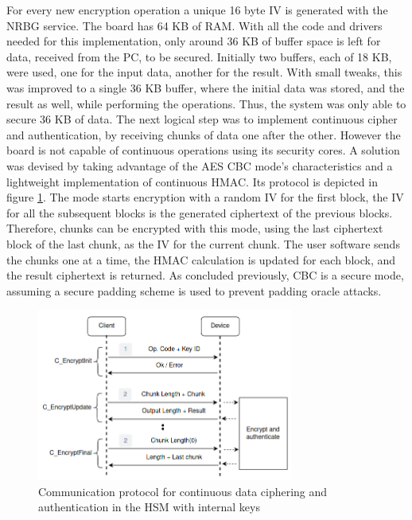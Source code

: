 For every new encryption operation a unique 16 byte \ac{IV} is generated with the \ac{NRBG} service.
The board has 64 KB of RAM. With all the code and drivers needed for this implementation, only around 36 KB of buffer space is left for data, received from the PC, to be secured. Initially two buffers, each of 18 KB, were used, one for the input data, another for the result. With small tweaks, this was improved to a single 36 KB buffer, where the initial data was stored, and the result as well, while performing the operations. Thus, the system was only able to secure 36 KB of data. The next logical step was to implement continuous cipher and authentication, by receiving chunks of data one after the other. However the board is not capable of continuous operations using its security cores.
A solution was devised by taking advantage of the AES \ac{CBC} mode's characteristics and a lightweight implementation of continuous HMAC. Its protocol is depicted in figure \ref{fig:protocol:data-exchange-chunks}. The mode starts encryption with a random IV for the first block, the IV for all the subsequent blocks is the generated ciphertext of the previous blocks. Therefore, chunks can be encrypted with this mode, using the last ciphertext block of the last chunk, as the IV for the current chunk. The user software sends the chunks one at a time, the HMAC calculation is updated for each block, and the result ciphertext is returned.
As concluded previously, CBC is a secure mode, assuming a secure padding scheme is used to prevent padding oracle attacks.

\begin{figure}[h!]
	\centering
	\includegraphics[width=0.75\textwidth]{./Images/data-exchange-chunks.png}
	\caption{Communication protocol for continuous data ciphering and authentication in the HSM with internal keys}
	\label{fig:protocol:data-exchange-chunks}
\end{figure}

